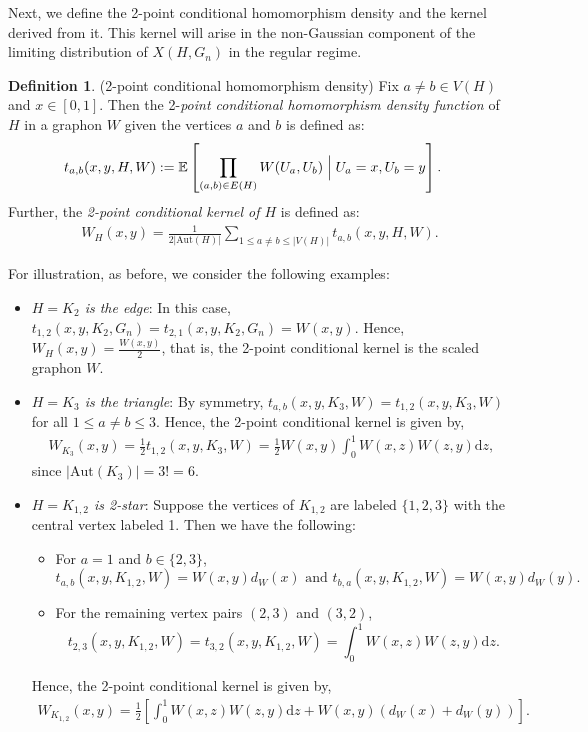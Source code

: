 \documentclass[11pt,reqno]{amsart}
\numberwithin{equation}{section}
\newcommand\Aut{\mathrm{Aut}}
\theoremstyle{definition}
\newtheorem{definition}{Definition}[section]
\begin{document}
Next, we define the 2-point conditional homomorphism density and the kernel derived from it. This kernel will arise in the non-Gaussian component of the limiting distribution of $X(H, G_n)$ in the regular regime. 


\begin{definition}\label{defn:WH}(2-point conditional homomorphism density) 
Fix $a \ne b \in V(H)$ and $x \in [0, 1]$. Then the 2-{\it point conditional homomorphism density function} of $H$ in a graphon $W$ given the vertices $a$ and $b$ is defined as: 
    \begin{align*}
        t_{a, b}(x, y,H,W) &:=\mathbb{E}\left[\prod_{(a,b)\in E(H)}W(U_{a},U_{b})\Bigm|U_a = x, U_b = y \right] .
    \end{align*}
Further, the {\it 2-point conditional
      kernel of $H$} is defined as:  
  \begin{align}\label{eq:WH}
  W_{H}(x,y)=\frac{1}{2|\Aut(H)|}\sum_{1\leq a\neq b\leq |V(H)|}t_{a, b}(x,y,H,W).
  \end{align}
   \end{definition}

For illustration, as before, we consider the following examples: 
\begin{itemize} 
\item {\it $H=K_2$ is the edge}: In this case, $t_{1, 2}(x, y, K_2, G_n) = t_{2, 1}(x, y, K_2, G_n) = W(x, y)$.  Hence, $W_H(x, y) = \frac{W(x,y)}{2}$, that is, the 2-point conditional kernel is the scaled graphon $W$. 
\item {\it $H=K_3$ is the triangle}: By symmetry, $t_{a,b}(x,y,K_{3},W) = t_{1,2}(x,y,K_{3},W)$ for all $1\leq a\neq b\leq 3$. Hence, the 2-point conditional kernel is given by,
\begin{align*} 
    W_{K_{3}}(x,y) = \frac{1}{2}t_{1,2}(x,y,K_{3},W) = \frac{1}{2}W(x,y)\int_{0}^{1}W(x,z)W(z,y)\mathrm{d}z, 
\end{align*} 
since $|\Aut(K_3)| = 3! =6$. 
\item {\it $H=K_{1, 2}$ is 2-star}: Suppose the vertices of $K_{1, 2}$ are labeled $\{ 1, 2, 3\}$ with the central vertex labeled 1. Then we have the following: 
\begin{itemize}
    \item For $a=1$ and $b\in \{2,3\}$, $$t_{a,b}(x,y,K_{1,2},W) = W(x,y)d_W(x) \text{ and } t_{b,a}(x,y,K_{1,2},W) = W(x,y)d_W(y).$$
    \item For the remaining vertex pairs $(2,3)$ and $(3,2)$, $$t_{2,3}(x,y,K_{1,2},W) = t_{3,2}(x,y,K_{1,2},W) = \int_{0}^{1}W(x,z)W(z,y)\mathrm d z.$$
\end{itemize}
Hence, the 2-point conditional kernel is given by,
\begin{align*}
    W_{K_{1,2}}(x,y) = \frac{1}{2}\left[\int_{0}^{1}W(x,z)W(z,y)\mathrm d z + W(x,y)(d_W(x) + d_{W}(y))\right]. 
\end{align*}
\end{itemize}
\end{document}
